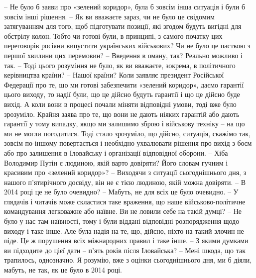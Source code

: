 – Не було б заяви про «зелений коридор», була б зовсім інша ситуація і були б зовсім інші рішення.
– Як ви вважаєте зараз, чи не було це свідомим затягуванням для того, щоб підготувати позиції, які згодом будуть вигідні для обстрілу колон. Тобто чи готові були, в принципі, з самого початку цих переговорів росіяни випустити українських військових? Чи не було це пасткою з першої хвилини цих перемовин?
– Введення в оману, так? Реально можливо і так.
– Тоді цього розуміння не було, як ви вважаєте, зокрема, в політичного керівництва країни?
– Нашої країни? Коли заявляє президент Російської Федерації про те, що ми готові забезпечити «зелений коридор», даємо гарантії цього виходу, то надії були, що це дійсно будуть гарантії і що це дійсно буде вихід. А коли вони в процесі почали міняти відповідні умови, тоді вже було зрозуміло. Крайня заява про те, що вони не дають ніяких гарантій або дають гарантії у тому випадку, якщо ми залишимо зброю і військову техніку – на що ми не могли погодитися. Тоді стало зрозуміло, що дійсно, ситуація, скажімо так, зовсім по-іншому повертається і необхідно ухвалювати рішення про вихід з боєм або про залишення в Іловайську і організації відповідної оборони.
– Хіба Володимир Путін є людиною, якій варто довіряти? Його словам гучним і красивим про «зелений коридор»?
– Виходячи з ситуації сьогоднішнього дня, з нашого п’ятирічного досвіду, він не є тією людиною, якій можна довіряти.
– В 2014 році це не було очевидно?
– Мабуть, не для всіх це було очевидно.
– У глядачів і читачів може скластися таке враження, що наше військово-політичне командування легковажне або наївне. Ви не ловили себе на такій думці?
– Не було у нас там наївності, тому і були віддані відповідні розпорядження щодо виходу і таке інше. Але була надія на те, що, дійсно, ніхто на такий злочин не піде. Це ж порушення всіх міжнародних правил і таке інше. 
– З якими думками ви підходите до цієї дати – п’ять років після Іловайська?
– Мені шкода, що так трапилось, однозначно.
Я розумію, вже з оцінки сьогоднішнього дня, ми б діяли, мабуть, не так, як це було в 2014 році.

